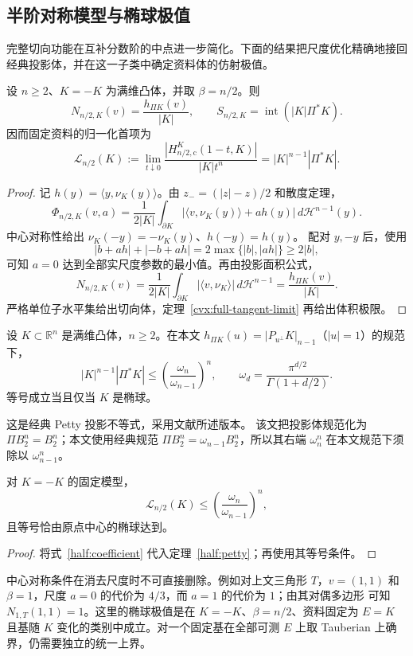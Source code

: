 \subsection{半阶对称模型与椭球极值}

完整切向功能在互补分数阶的中点进一步简化。下面的结果把尺度优化精确地接回
经典投影体，并在这一子类中确定资料体的仿射极值。

\begin{theorem}[半阶中心对称固定模型]\label{half:projection-identity}
设 $n\ge2$、$K=-K$ 为满维凸体，并取 $\beta=n/2$。则
\[
 N_{n/2,K}(v)=\frac{h_{\Pi K}(v)}{|K|},\qquad
 S_{n/2,K}=\operatorname{int}(|K|\Pi^*K).
\]
因而固定资料的归一化首项为
\begin{equation}\label{half:coefficient}
 \mathcal L_{n/2}(K):=
 \lim_{t\downarrow0}\frac{|H^K_{n/2,\mathrm c}(1-t,K)|}{|K|t^n}
 =|K|^{n-1}|\Pi^*K|.
\end{equation}
\end{theorem}
\begin{proof}
记 $h(y)=\langle y,\nu_K(y)\rangle$。由 $z_-=(|z|-z)/2$ 和散度定理，
\[
 \Phi_{n/2,K}(v,a)
 =\frac1{2|K|}\int_{\partial K}
 |\langle v,\nu_K(y)\rangle+a h(y)|\,d\mathcal H^{n-1}(y).
\]
中心对称性给出 $\nu_K(-y)=-\nu_K(y)$、$h(-y)=h(y)$。
配对 $y,-y$ 后，使用
\[
 |b+a h|+|-b+a h|=2\max\{|b|,|a h|\}\ge2|b|,
\]
可知 $a=0$ 达到全部实尺度参数的最小值。再由投影面积公式，
\[
 N_{n/2,K}(v)=\frac1{2|K|}\int_{\partial K}
 |\langle v,\nu_K\rangle|\,d\mathcal H^{n-1}
 =\frac{h_{\Pi K}(v)}{|K|}.
\]
严格单位子水平集给出切向体，定理~\ref{cvx:full-tangent-limit} 再给出体积极限。
\end{proof}

\begin{classical}\label{half:petty}
设 $K\subset\mathbb R^n$ 是满维凸体，$n\ge2$。在本文
$h_{\Pi K}(u)=|P_{u^\perp}K|_{n-1}$（$|u|=1$）的规范下，
\begin{equation}\label{half:petty-bound}
 |K|^{n-1}|\Pi^*K|
 \le\left(\frac{\omega_n}{\omega_{n-1}}\right)^n,
 \qquad \omega_d=\frac{\pi^{d/2}}{\Gamma(1+d/2)}.
\end{equation}
等号成立当且仅当 $K$ 是椭球。
\end{classical}

这是经典 Petty 投影不等式，采用文献\cite[第1节]{LutwakYangZhang2000}所述版本。
该文把投影体规范化为 $\Pi B_2^n=B_2^n$；本文使用经典规范
$\Pi B_2^n=\omega_{n-1}B_2^n$，所以其右端 $\omega_n^n$ 在本文规范下须除以
$\omega_{n-1}^n$。

\begin{corollary}[对称半阶固定模型的最优资料体]\label{half:ellipsoid-extremum}
对 $K=-K$ 的固定模型，
\[
 \mathcal L_{n/2}(K)\le
 \left(\frac{\omega_n}{\omega_{n-1}}\right)^n,
\]
且等号恰由原点中心的椭球达到。
\end{corollary}
\begin{proof}
将式~\eqref{half:coefficient} 代入定理~\ref{half:petty}；再使用其等号条件。
\end{proof}

\begin{remark}[对称条件与优化对象]\label{half:scope}
中心对称条件在消去尺度时不可直接删除。例如对上文三角形 $T$，$v=(1,1)$ 和
$\beta=1$，尺度 $a=0$ 的代价为 $4/3$，而 $a=1$ 的代价为 $1$；由其对偶多边形
可知 $N_{1,T}(1,1)=1$。这里的椭球极值是在 $K=-K$、$\beta=n/2$、资料固定为
$E=K$ 且基随 $K$ 变化的类别中成立。对一个固定基在全部可测 $E$ 上取 Tauberian
上确界，仍需要独立的统一上界。
\end{remark}
